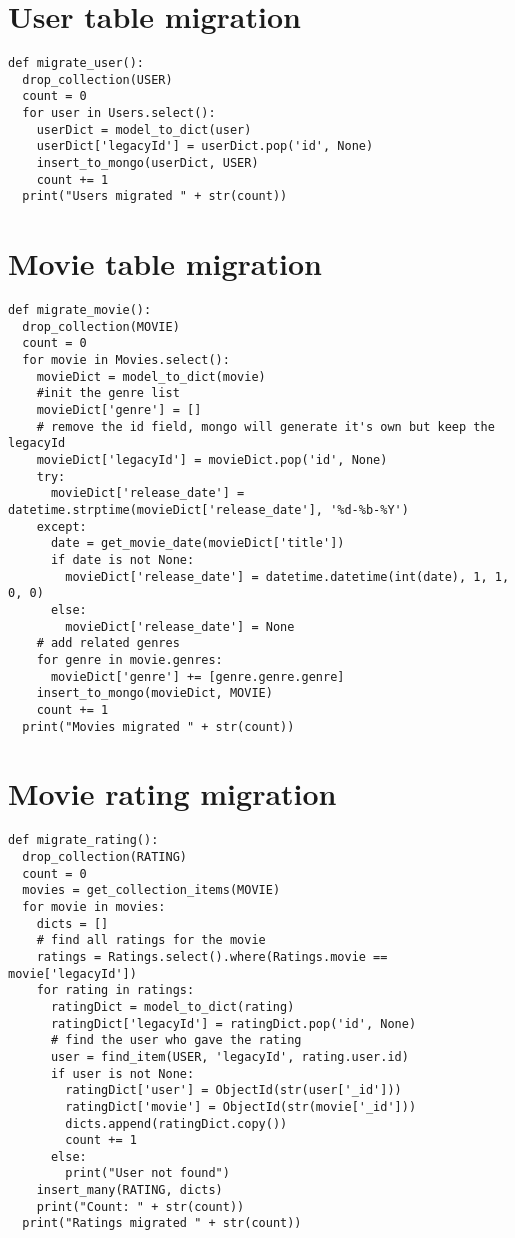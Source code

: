\documentclass[a4paper, titlepage, 11pt]{article}
\begin{document}
\begin{appendices}
\begin{singlespace}
\begin{lstlisting}
\end{lstlisting}
\label{fig:py2}\section*{User table migration}
\begin{lstlisting}
def migrate_user():
  drop_collection(USER)
  count = 0
  for user in Users.select():
    userDict = model_to_dict(user)
    userDict['legacyId'] = userDict.pop('id', None)
    insert_to_mongo(userDict, USER)
    count += 1
  print("Users migrated " + str(count))
\end{lstlisting}
\label{fig:py3}\section*{Movie table migration}
\begin{lstlisting}
def migrate_movie():
  drop_collection(MOVIE)
  count = 0
  for movie in Movies.select():
    movieDict = model_to_dict(movie)
    #init the genre list
    movieDict['genre'] = []
    # remove the id field, mongo will generate it's own but keep the legacyId
    movieDict['legacyId'] = movieDict.pop('id', None)
    try:
      movieDict['release_date'] = datetime.strptime(movieDict['release_date'], '%d-%b-%Y')
    except:
      date = get_movie_date(movieDict['title'])
      if date is not None:
        movieDict['release_date'] = datetime.datetime(int(date), 1, 1, 0, 0)
      else:
        movieDict['release_date'] = None
    # add related genres
    for genre in movie.genres:
      movieDict['genre'] += [genre.genre.genre]
    insert_to_mongo(movieDict, MOVIE)
    count += 1
  print("Movies migrated " + str(count))
\end{lstlisting}
\label{fig:py4}\section*{Movie rating migration}
\begin{lstlisting}
def migrate_rating():
  drop_collection(RATING)
  count = 0
  movies = get_collection_items(MOVIE)
  for movie in movies:
    dicts = []
    # find all ratings for the movie
    ratings = Ratings.select().where(Ratings.movie == movie['legacyId'])
    for rating in ratings:
      ratingDict = model_to_dict(rating)
      ratingDict['legacyId'] = ratingDict.pop('id', None)
      # find the user who gave the rating
      user = find_item(USER, 'legacyId', rating.user.id)
      if user is not None:
        ratingDict['user'] = ObjectId(str(user['_id']))
        ratingDict['movie'] = ObjectId(str(movie['_id']))
        dicts.append(ratingDict.copy())
        count += 1
      else:
        print("User not found")
    insert_many(RATING, dicts)
    print("Count: " + str(count))
  print("Ratings migrated " + str(count))
\end{lstlisting}

\end{singlespace}


\end{appendices}
\end{document}
